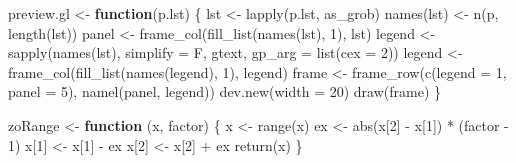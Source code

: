 \documentclass[
]{article}
\newenvironment{Shaded}{\begin{snugshade}}{\end{snugshade}}
\newcommand{\AttributeTok}[1]{\textcolor[rgb]{0.77,0.63,0.00}{#1}}
\newcommand{\ControlFlowTok}[1]{\textcolor[rgb]{0.13,0.29,0.53}{\textbf{#1}}}
\newcommand{\DecValTok}[1]{\textcolor[rgb]{0.00,0.00,0.81}{#1}}
\newcommand{\FunctionTok}[1]{\textcolor[rgb]{0.00,0.00,0.00}{#1}}
\newcommand{\NormalTok}[1]{#1}
\newcommand{\OtherTok}[1]{\textcolor[rgb]{0.56,0.35,0.01}{#1}}
\newcommand{\SpecialCharTok}[1]{\textcolor[rgb]{0.00,0.00,0.00}{#1}}
\begin{document}
\begin{Shaded}
\begin{Highlighting}[]
\NormalTok{preview.gl }\OtherTok{\textless{}{-}} \ControlFlowTok{function}\NormalTok{(p.lst) \{}
\NormalTok{  lst }\OtherTok{\textless{}{-}} \FunctionTok{lapply}\NormalTok{(p.lst, as\_grob)}
  \FunctionTok{names}\NormalTok{(lst) }\OtherTok{\textless{}{-}} \FunctionTok{n}\NormalTok{(p, }\FunctionTok{length}\NormalTok{(lst))}
\NormalTok{  panel }\OtherTok{\textless{}{-}} \FunctionTok{frame\_col}\NormalTok{(}\FunctionTok{fill\_list}\NormalTok{(}\FunctionTok{names}\NormalTok{(lst), }\DecValTok{1}\NormalTok{), lst)}
\NormalTok{  legend }\OtherTok{\textless{}{-}} \FunctionTok{sapply}\NormalTok{(}\FunctionTok{names}\NormalTok{(lst), }\AttributeTok{simplify =}\NormalTok{ F, gtext, }\AttributeTok{gp\_arg =} \FunctionTok{list}\NormalTok{(}\AttributeTok{cex =} \DecValTok{2}\NormalTok{))}
\NormalTok{  legend }\OtherTok{\textless{}{-}} \FunctionTok{frame\_col}\NormalTok{(}\FunctionTok{fill\_list}\NormalTok{(}\FunctionTok{names}\NormalTok{(legend), }\DecValTok{1}\NormalTok{), legend)}
\NormalTok{  frame }\OtherTok{\textless{}{-}} \FunctionTok{frame\_row}\NormalTok{(}\FunctionTok{c}\NormalTok{(}\AttributeTok{legend =} \DecValTok{1}\NormalTok{, }\AttributeTok{panel =} \DecValTok{5}\NormalTok{), }\FunctionTok{namel}\NormalTok{(panel, legend))}
  \FunctionTok{dev.new}\NormalTok{(}\AttributeTok{width =} \DecValTok{20}\NormalTok{)}
  \FunctionTok{draw}\NormalTok{(frame)}
\NormalTok{\}}

\NormalTok{zoRange }\OtherTok{\textless{}{-}} \ControlFlowTok{function}\NormalTok{ (x, factor) }
\NormalTok{\{}
\NormalTok{  x }\OtherTok{\textless{}{-}} \FunctionTok{range}\NormalTok{(x)}
\NormalTok{  ex }\OtherTok{\textless{}{-}} \FunctionTok{abs}\NormalTok{(x[}\DecValTok{2}\NormalTok{] }\SpecialCharTok{{-}}\NormalTok{ x[}\DecValTok{1}\NormalTok{]) }\SpecialCharTok{*}\NormalTok{ (factor }\SpecialCharTok{{-}} \DecValTok{1}\NormalTok{)}
\NormalTok{  x[}\DecValTok{1}\NormalTok{] }\OtherTok{\textless{}{-}}\NormalTok{ x[}\DecValTok{1}\NormalTok{] }\SpecialCharTok{{-}}\NormalTok{ ex}
\NormalTok{  x[}\DecValTok{2}\NormalTok{] }\OtherTok{\textless{}{-}}\NormalTok{ x[}\DecValTok{2}\NormalTok{] }\SpecialCharTok{+}\NormalTok{ ex}
  \FunctionTok{return}\NormalTok{(x)}
\NormalTok{\}}


\end{Highlighting}
\end{Shaded}
\end{document}
